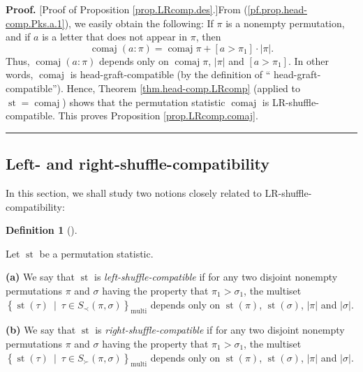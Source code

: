 \documentclass[numbers=enddot,12pt,final,onecolumn,notitlepage]{scrartcl}%
\theoremstyle{definition}
\newtheorem{defi}[theo]{Definition}
\newenvironment{definition}[1][]
{\begin{defi}[#1]\begin{leftbar}}
{\end{leftbar}\end{defi}}
\newenvironment{proof}[1][Proof]{\noindent\textbf{#1.} }{\ \rule{0.5em}{0.5em}}
\begin{document}
\begin{proof}
[Proof of Proposition \ref{prop.LRcomp.des}.]From
(\ref{pf.prop.head-comp.Pks.a.1}), we easily obtain the following: If $\pi$ is
a nonempty permutation, and if $a$ is a letter that does not appear in $\pi$,
then%
\[
\operatorname*{comaj}\left(  a:\pi\right)  =\operatorname*{comaj}\pi+\left[
a>\pi_{1}\right]  \cdot\left\vert \pi\right\vert .
\]
Thus, $\operatorname*{comaj}\left(  a:\pi\right)  $ depends only on
$\operatorname*{comaj}\pi$, $\left\vert \pi\right\vert $ and $\left[
a>\pi_{1}\right]  $. In other words, $\operatorname*{comaj}$ is
head-graft-compatible (by the definition of \textquotedblleft
head-graft-compatible\textquotedblright). Hence, Theorem
\ref{thm.head-comp.LRcomp} (applied to $\operatorname*{st}%
=\operatorname*{comaj}$) shows that the permutation statistic
$\operatorname*{comaj}$ is LR-shuffle-compatible. This proves Proposition
\ref{prop.LRcomp.comaj}.
\end{proof}

\subsection{Left- and right-shuffle-compatibility}

In this section, we shall study two notions closely related to LR-shuffle-compatibility:

\begin{definition}
\label{def.LR.left-right}Let $\operatorname*{st}$ be a permutation statistic.

\textbf{(a)} We say that $\operatorname*{st}$ is
\textit{left-shuffle-compatible} if for any two disjoint nonempty permutations
$\pi$ and $\sigma$ having the property that $\pi_{1}>\sigma_{1}$, the multiset
$\left\{  \operatorname*{st}\left(  \tau\right)  \ \mid\ \tau\in S_{\prec
}\left(  \pi,\sigma\right)  \right\}  _{\operatorname*{multi}}$ depends only
on $\operatorname*{st}\left(  \pi\right)  $, $\operatorname*{st}\left(
\sigma\right)  $, $\left\vert \pi\right\vert $ and $\left\vert \sigma
\right\vert $.

\textbf{(b)} We say that $\operatorname*{st}$ is
\textit{right-shuffle-compatible} if for any two disjoint nonempty
permutations $\pi$ and $\sigma$ having the property that $\pi_{1}>\sigma_{1}$,
the multiset $\left\{  \operatorname*{st}\left(  \tau\right)  \ \mid\ \tau\in
S_{\succ}\left(  \pi,\sigma\right)  \right\}  _{\operatorname*{multi}}$
depends only on $\operatorname*{st}\left(  \pi\right)  $, $\operatorname*{st}%
\left(  \sigma\right)  $, $\left\vert \pi\right\vert $ and $\left\vert
\sigma\right\vert $.
\end{definition}
\end{document}
